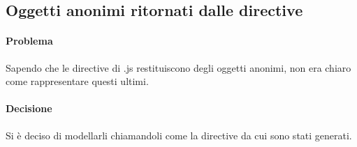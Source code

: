 \subsection{Oggetti anonimi ritornati dalle directive}
\paragraph{Problema}
Sapendo che le directive di .js restituiscono degli oggetti anonimi, non era chiaro come rappresentare questi ultimi.
\paragraph{Decisione}
Si è deciso di modellarli chiamandoli come la directive da cui sono stati generati.

